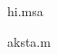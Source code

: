 \documentclass{article}
\begin{document}
\textsanskrit{hi.msa}

\textsanskrit{aksta.m}
\end{document}
